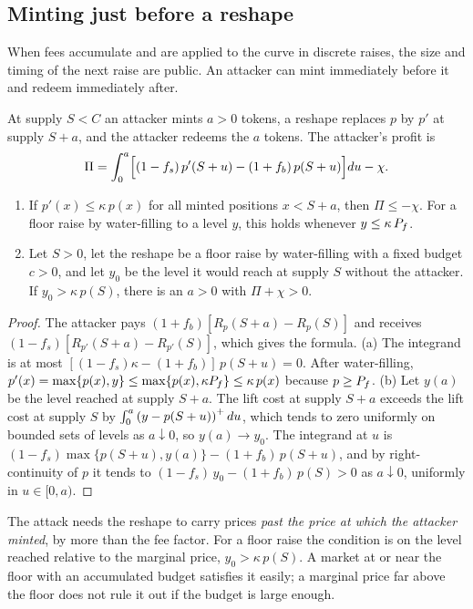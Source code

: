 \subsection{Minting just before a reshape}\label{sec:jit}

When fees accumulate and are applied to the curve in discrete raises, the size and timing of the next raise are public. An attacker can mint immediately before it and redeem immediately after.

\begin{proposition}\label{prop:jit}
At supply $S<C$ an attacker mints $a>0$ tokens, a reshape replaces $p$ by $p'$ at supply $S+a$, and the attacker redeems the $a$ tokens. The attacker's profit is
\[
\Pi=\int_0^a\Bigl[(1-f_s)\,p'(S+u)-(1+f_b)\,p(S+u)\Bigr]du-\chi .
\]
\begin{enumerate}[label=(\alph*)]
\item If $p'(x)\le\kappa\,p(x)$ for all minted positions $x<S+a$, then $\Pi\le-\chi$. For a floor raise by water-filling to a level $y$, this holds whenever $y\le\kappa\,P_f$.
\item Let $S>0$, let the reshape be a floor raise by water-filling with a fixed budget $c>0$, and let $y_0$ be the level it would reach at supply $S$ without the attacker. If $y_0>\kappa\,p(S)$, there is an $a>0$ with $\Pi+\chi>0$.
\end{enumerate}
\end{proposition}
\begin{proof}
The attacker pays $(1+f_b)[R_p(S+a)-R_p(S)]$ and receives $(1-f_s)[R_{p'}(S+a)-R_{p'}(S)]$, which gives the formula. (a) The integrand is at most $[(1-f_s)\kappa-(1+f_b)]\,p(S+u)=0$. After water-filling, $p'(x)=\max\{p(x),y\}\le\max\{p(x),\kappa P_f\}\le\kappa\,p(x)$ because $p\ge P_f$. (b) Let $y(a)$ be the level reached at supply $S+a$. The lift cost at supply $S+a$ exceeds the lift cost at supply $S$ by $\int_0^a\left(y-p(S+u)\right)^{+}du$, which tends to zero uniformly on bounded sets of levels as $a\downarrow0$, so $y(a)\to y_0$. The integrand at $u$ is $(1-f_s)\max\{p(S+u),y(a)\}-(1+f_b)\,p(S+u)$, and by right-continuity of $p$ it tends to $(1-f_s)\,y_0-(1+f_b)\,p(S)>0$ as $a\downarrow0$, uniformly in $u\in[0,a)$.
\end{proof}

The attack needs the reshape to carry prices \emph{past the price at which the attacker minted}, by more than the fee factor. For a floor raise the condition is on the level reached relative to the marginal price, $y_0>\kappa\,p(S)$. A market at or near the floor with an accumulated budget satisfies it easily; a marginal price far above the floor does not rule it out if the budget is large enough.

